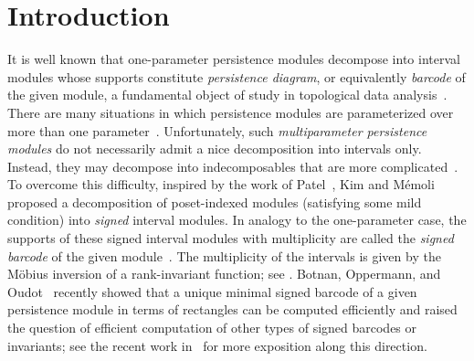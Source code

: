 \documentclass[11pt]{article}
\theoremstyle{plain}%
\begin{document}
\section{Introduction}
It is well known that one-parameter persistence modules decompose into
interval modules whose supports constitute \emph{persistence diagram}, or equivalently
\emph{barcode} of the given module, a fundamental object of study in topological data analysis~\cite{BS14,DW22,EH2010,Oudot15}. There are many situations in which persistence modules are parameterized over more than one parameter~\cite{BL23,carlsson2009theory,escolar2016persistence,lesnick2015theory,miller2019modules}.
Unfortunately, such \emph{multiparameter
persistence modules} do not necessarily admit a nice decomposition into intervals only. Instead,
they may decompose into indecomposables that are more complicated~\cite{carlsson2009theory}.
To overcome this difficulty, inspired by the work of Patel~\cite{patel2018generalized},
Kim and M\'{e}moli~\cite{kim2018generalized} proposed a decomposition
of poset-indexed modules (satisfying some mild condition)
into \emph{signed} interval modules.
In analogy to the one-parameter case, the supports
of these signed interval modules with multiplicity
are called the \emph{signed barcode} of the given module~\cite{botnan2021signed}.
The multiplicity of the
intervals is given by the M\"{o}bius inversion of a rank-invariant function; see
\cite{kim2018generalized,patel2018generalized}.
Botnan, Oppermann, and Oudot~\cite{botnan2021signed} recently showed
that a unique minimal signed barcode of a given persistence module
in terms of rectangles can be computed efficiently and raised the question of efficient
computation of other types of signed barcodes or invariants; see the recent work
in~\cite{CKM24} for more exposition along this direction. 
\end{document}
